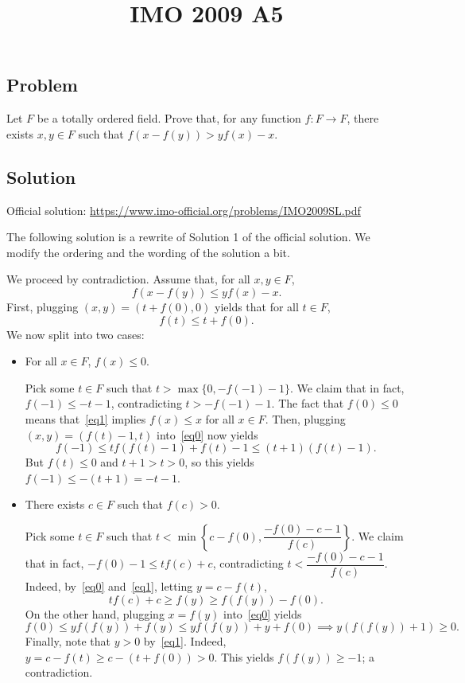 \documentclass{article}
\title{IMO 2009 A5}
\author{}
\date{}
\begin{document}
\maketitle



\subsection*{Problem}

Let $F$ be a totally ordered field.
Prove that, for any function $f : F \to F$, there exists $x, y \in F$ such that $f(x - f(y)) > y f(x) - x$.



\subsection*{Solution}

Official solution: \url{https://www.imo-official.org/problems/IMO2009SL.pdf}

The following solution is a rewrite of Solution 1 of the official solution.
We modify the ordering and the wording of the solution a bit.

We proceed by contradiction.
Assume that, for all $x, y \in F$,
\[ f(x - f(y)) \leq y f(x) - x. \tag{*}\label{eq0} \]
First, plugging $(x, y) = (t + f(0), 0)$ yields that for all $t \in F$,
\[ f(t) \leq t + f(0). \tag{1}\label{eq1} \]
We now split into two cases:

\begin{itemize}

    \item 
    For all $x \in F$, $f(x) \leq 0$.

    Pick some $t \in F$ such that $t > \max\{0, -f(-1) - 1\}$.
    We claim that in fact, $f(-1) \leq -t - 1$, contradicting $t > -f(-1) - 1$.
    The fact that $f(0) \leq 0$ means that~\eqref{eq1} implies $f(x) \leq x$ for all $x \in F$.
    Then, plugging $(x, y) = (f(t) - 1, t)$ into~\eqref{eq0} now yields
    \[ f(-1) \leq tf(f(t) - 1) + f(t) - 1 \leq (t + 1)(f(t) - 1). \]
    But $f(t) \leq 0$ and $t + 1 > t > 0$, so this yields $f(-1) \leq -(t + 1) = -t - 1$.

    \item
    There exists $c \in F$ such that $f(c) > 0$.

    Pick some $t \in F$ such that $t < \min\left\{c - f(0), \dfrac{-f(0) - c - 1}{f(c)}\right\}$.
    We claim that in fact, $-f(0) - 1 \leq tf(c) + c$, contradicting $t < \dfrac{-f(0) - c - 1}{f(c)}$.
    Indeed, by~\eqref{eq0} and~\eqref{eq1}, letting $y = c - f(t)$,
    \[ tf(c) + c \geq f(y) \geq f(f(y)) - f(0). \]
    On the other hand, plugging $x = f(y)$ into~\eqref{eq0} yields
    \[ f(0) \leq y f(f(y)) + f(y) \leq y f(f(y)) + y + f(0) \implies y (f(f(y)) + 1) \geq 0. \]
    Finally, note that $y > 0$ by~\eqref{eq1}.
    Indeed, $y = c - f(t) \geq c - (t + f(0)) > 0$.
    This yields $f(f(y)) \geq -1$; a contradiction.

\end{itemize}
\end{document}
